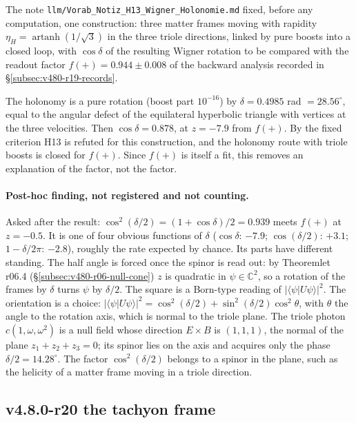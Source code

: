 The note \texttt{llm/Vorab\_Notiz\_H13\_Wigner\_Holonomie.md} fixed, before any computation, one construction: three
matter frames moving with rapidity \(\eta_H=\operatorname{artanh}(1/\sqrt3)\) in the three triole directions, linked by
pure boosts into a closed loop, with \(\cos\delta\) of the resulting Wigner rotation to be compared with the readout
factor \(f(+)=0.944\pm0.008\) of the backward analysis recorded in \S\ref{subsec:v480-r19-records}.

The holonomy is a pure rotation (boost part \(10^{-16}\)) by \(\delta=0.4985\) rad \(=28.56^\circ\), equal to the
angular defect of the equilateral hyperbolic triangle with vertices at the three velocities.  Then
\(\cos\delta=0.878\), at \(z=-7.9\) from \(f(+)\).  By the fixed criterion H13 is refuted for this construction, and the
holonomy route with triole boosts is closed for \(f(+)\).  Since \(f(+)\) is itself a fit, this removes an explanation
of the factor, not the factor.

\paragraph{Post-hoc finding, not registered and not counting.}
Asked after the result: \(\cos^2(\delta/2)=(1+\cos\delta)/2=0.939\) meets \(f(+)\) at \(z=-0.5\).  It is one of four
obvious functions of \(\delta\) (\(\cos\delta\): \(-7.9\); \(\cos(\delta/2)\): \(+3.1\); \(1-\delta/2\pi\): \(-2.8\)), roughly
the rate expected by chance.  Its parts have different standing.  The half angle is forced once the spinor is read
out: by Theoremlet r06.4 (\S\ref{subsec:v480-r06-null-cone}) \(z\) is quadratic in \(\psi\in\mathbb C^2\), so a rotation
of the frames by \(\delta\) turns \(\psi\) by \(\delta/2\).  The square is a Born-type reading of \(|\langle\psi|U\psi\rangle|^2\).
The orientation is a choice: \(|\langle\psi|U\psi\rangle|^2=\cos^2(\delta/2)+\sin^2(\delta/2)\cos^2\theta\), with \(\theta\) the
angle to the rotation axis, which is normal to the triole plane.  The triole photon \(c(1,\omega,\omega^2)\) is a null
field whose direction \(E\times B\) is \((1,1,1)\), the normal of the plane \(z_1+z_2+z_3=0\); its spinor lies on the
axis and acquires only the phase \(\delta/2=14.28^\circ\).  The factor \(\cos^2(\delta/2)\) belongs to a spinor in the plane,
such as the helicity of a matter frame moving in a triole direction.

\subsection*{v4.8.0-r20 the tachyon frame}
\label{subsec:v480-r20-tachyon}

